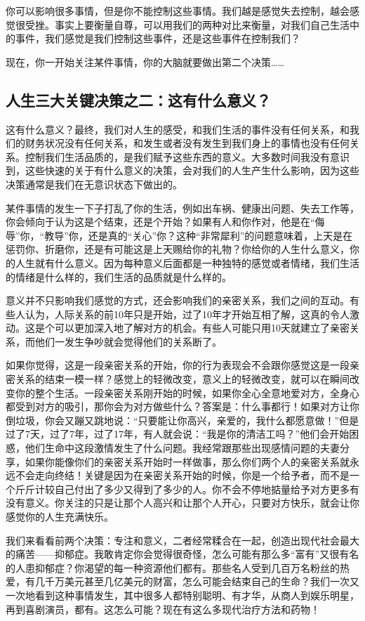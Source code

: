 你可以影响很多事情，但是你不能控制这些事情。我们越是感觉失去控制，越会感觉很受挫。事实上要衡量自尊，可以用我们的两种对比来衡量，对我们自己生活中的事件，我们感觉是我们控制这些事件，还是这些事件在控制我们？

现在，你一开始关注某件事情，你的大脑就要做出第二个决策……

\subsection{人生三大关键决策之二：这有什么意义？}

这有什么意义？最终，我们对人生的感受，和我们生活的事件没有任何关系，和我们的财务状况没有任何关系，和发生或者没有发生到我们身上的事情也没有任何关系。控制我们生活品质的，是我们赋予这些东西的意义。大多数时间我没有意识到，这些快速的关于有什么意义的决策，会对我们的人生产生什么影响，因为这些决策通常是我们在无意识状态下做出的。

某件事情的发生一下子打乱了你的生活，例如出车祸、健康出问题、失去工作等，你会倾向于认为这是个结束，还是个开始？如果有人和你作对，他是在“侮辱”你，“教导”你，还是真的“关心”你？这种“非常犀利”的问题意味着，上天是在惩罚你、折磨你，还是有可能这是上天赐给你的礼物？你给你的人生什么意义，你的人生就有什么意义。因为每种意义后面都是一种独特的感觉或者情绪，我们生活的情绪是什么样的，我们生活的品质就是什么样的。

意义并不只影响我们感觉的方式，还会影响我们的亲密关系，我们之间的互动。有些人认为，人际关系的前10年只是开始，过了10年才开始互相了解，这真的令人激动。这是个可以更加深入地了解对方的机会。有些人可能只用10天就建立了亲密关系，而他们一发生争吵就会觉得他们的关系断了。

如果你觉得，这是一段亲密关系的开始，你的行为表现会不会跟你感觉这是一段亲密关系的结束一模一样？感觉上的轻微改变，意义上的轻微改变，就可以在瞬间改变你的整个生活。一段亲密关系刚开始的时候，如果你全心全意地爱对方，全身心都受到对方的吸引，那你会为对方做些什么？答案是：什么事都行！如果对方让你倒垃圾，你会又蹦又跳地说：“只要能让你高兴，亲爱的，我什么都愿意做！”但是过了7天，过了7年，过了17年，有人就会说：“我是你的清洁工吗？”他们会开始困惑，他们生命中这段激情发生了什么问题。我经常跟那些出现感情问题的夫妻分享，如果你能像你们的亲密关系开始时一样做事，那么你们两个人的亲密关系就永远不会走向终结！关键是因为在亲密关系开始的时候，你是一个给予者，而不是一个斤斤计较自己付出了多少又得到了多少的人。你不会不停地掂量给予对方更多有没有意义。你关注的只是让那个人高兴和让那个人开心，只要对方快乐，就会让你感觉你的人生充满快乐。

我们来看看前两个决策：专注和意义，二者经常糅合在一起，创造出现代社会最大的痛苦——抑郁症。我敢肯定你会觉得很奇怪，怎么可能有那么多“富有”又很有名的人患抑郁症？你渴望的每一种资源他们都有。那些名人受到几百万名粉丝的热爱，有几千万美元甚至几亿美元的财富，怎么可能会结束自己的生命？我们一次又一次地看到这种事情发生，其中很多人都特别聪明、有才华，从商人到娱乐明星，再到喜剧演员，都有。这怎么可能？现在有这么多现代治疗方法和药物！

